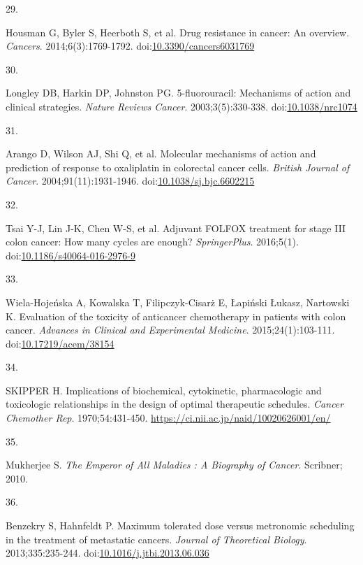 \documentclass[11pt]{umnthesis}
\newlength{\csllabelwidth}
\newlength{\cslhangindent}
\newenvironment{CSLReferences}[2] %
 {%
  \setlength{\parindent}{0pt}
  \ifodd #1 \everypar{\setlength{\hangindent}{\cslhangindent}}\ignorespaces\fi
  \ifnum #2 > 0
  \setlength{\parskip}{#2\baselineskip}
  \fi
 }%
 {}
\newcommand{\CSLLeftMargin}[1]{\parbox[t]{\csllabelwidth}{#1}}
\newcommand{\CSLRightInline}[1]{\parbox[t]{\linewidth - \csllabelwidth}{#1}}
\begin{document}
\begin{CSLReferences}{0}{0}
\leavevmode{}%
\CSLLeftMargin{29. }
\CSLRightInline{Housman G, Byler S, Heerboth S, et al. Drug resistance in cancer: An overview. \emph{Cancers}. 2014;6(3):1769-1792. doi:\href{https://doi.org/10.3390/cancers6031769}{10.3390/cancers6031769}}

\leavevmode{}%
\CSLLeftMargin{30. }
\CSLRightInline{Longley DB, Harkin DP, Johnston PG. 5-fluorouracil: Mechanisms of action and clinical strategies. \emph{Nature Reviews Cancer}. 2003;3(5):330-338. doi:\href{https://doi.org/10.1038/nrc1074}{10.1038/nrc1074}}

\leavevmode{}%
\CSLLeftMargin{31. }
\CSLRightInline{Arango D, Wilson AJ, Shi Q, et al. Molecular mechanisms of action and prediction of response to oxaliplatin in colorectal cancer cells. \emph{British Journal of Cancer}. 2004;91(11):1931-1946. doi:\href{https://doi.org/10.1038/sj.bjc.6602215}{10.1038/sj.bjc.6602215}}

\leavevmode{}%
\CSLLeftMargin{32. }
\CSLRightInline{Tsai Y-J, Lin J-K, Chen W-S, et al. Adjuvant {FOLFOX} treatment for stage {III} colon cancer: How many cycles are enough? \emph{{SpringerPlus}}. 2016;5(1). doi:\href{https://doi.org/10.1186/s40064-016-2976-9}{10.1186/s40064-016-2976-9}}

\leavevmode{}%
\CSLLeftMargin{33. }
\CSLRightInline{Wiela-Hojeńska A, Kowalska T, Filipczyk-Cisarż E, Łapiński Łukasz, Nartowski K. Evaluation of the toxicity of anticancer chemotherapy in patients with colon cancer. \emph{Advances in Clinical and Experimental Medicine}. 2015;24(1):103-111. doi:\href{https://doi.org/10.17219/acem/38154}{10.17219/acem/38154}}

\leavevmode{}%
\CSLLeftMargin{34. }
\CSLRightInline{SKIPPER H. Implications of biochemical, cytokinetic, pharmacologic and toxicologic relationships in the design of optimal therapeutic schedules. \emph{Cancer Chemother Rep}. 1970;54:431-450. \url{https://ci.nii.ac.jp/naid/10020626001/en/}}

\leavevmode{}%
\CSLLeftMargin{35. }
\CSLRightInline{Mukherjee S. \emph{The Emperor of All Maladies : A Biography of Cancer}. Scribner; 2010.}

\leavevmode{}%
\CSLLeftMargin{36. }
\CSLRightInline{Benzekry S, Hahnfeldt P. Maximum tolerated dose versus metronomic scheduling in the treatment of metastatic cancers. \emph{Journal of Theoretical Biology}. 2013;335:235-244. doi:\href{https://doi.org/10.1016/j.jtbi.2013.06.036}{10.1016/j.jtbi.2013.06.036}}


\end{CSLReferences}
\end{document}
